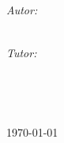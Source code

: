 \documentclass[
11pt, %
oneside, %
spanish, %
singlespacing, %
headsepline, %
]{MastersDoctoralThesis} %
\author{Alejandro Rodríguez López}
\begin{document}
\frontmatter %

\pagestyle{plain} %


\begin{titlepage}
\begin{center}

\vspace*{.06\textheight}
{\scshape\LARGE \univname\\\facname\par}\vspace{1.5cm} %
\textsc{\Large \subjectname}\\[0.5cm] %

\HRule \\[0.4cm] %
{\huge \bfseries \ttitle\par}\vspace{0.4cm} %
\HRule \\[1.5cm] %
 
\begin{minipage}[t]{\textwidth}
	\begin{flushleft} \large
		\emph{Autor:}\\
		\authorname\\
    \vspace{2em}
	\end{flushleft}
\end{minipage}
\begin{minipage}[t]{0.8\textwidth}
	\begin{flushright} \large
		\emph{Tutor:} \\
		\tutorName
	\end{flushright}
\end{minipage}\\
 
\vfill

\large\textit{\requirements}\\[0.3cm] 
 
\vfill

{\large \today}\\[4cm] %
 
\vfill
\end{center}
\end{titlepage}
\end{document}
